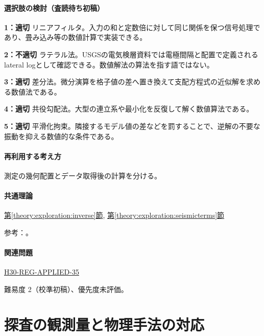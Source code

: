 \paragraph{選択肢の検討（査読待ち初稿）}\mbox{}\par

\noindent\textbf{1：適切} リニアフィルタ。入力の和と定数倍に対して同じ関係を保つ信号処理であり、畳み込み等の数値計算で実装できる。\par

\noindent\textbf{2：不適切} ラテラル法。USGSの電気検層資料では電極間隔と配置で定義されるlateral logとして確認できる。数値解法の算法を指す語ではない。\par

\noindent\textbf{3：適切} 差分法。微分演算を格子値の差へ置き換えて支配方程式の近似解を求める数値法である。\par

\noindent\textbf{4：適切} 共役勾配法。大型の連立系や最小化を反復して解く数値算法である。\par

\noindent\textbf{5：適切} 平滑化拘束。隣接するモデル値の差などを罰することで、逆解の不要な振動を抑える数値的な条件である。\par

\paragraph{再利用する考え方} 測定の幾何配置とデータ取得後の計算を分ける。

\paragraph{共通理論} \hyperref[theory:exploration:inverse]{第\ref*{theory:exploration:inverse}節}, \hyperref[theory:exploration:seismicterms]{第\ref*{theory:exploration:seismicterms}節}

\par 参考：\cite{usgs_lateral_logging,pygimli_inversion,mit_signals2010}。

\paragraph{関連問題} \hyperref[q:h30-reg-applied-35]{H30-REG-APPLIED-35}

\par 難易度 2（校準初稿）、優先度未評価。

\section{探査の観測量と物理手法の対応}

